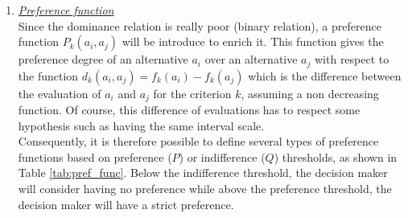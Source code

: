 \begin{enumerate}
\item \textit{\underline{Preference function}}\\
Since the dominance relation is really poor (binary relation), a preference function $P_k(a_i,a_j)$ will be introduce to enrich it. This function gives the preference degree of an alternative $a_i$ over an alternative $a_j$ with respect to the function $d_k(a_i,a_j) = f_k(a_i) - f_k(a_j)$ which is the difference between the evaluation of $a_i$ and $a_j$ for the criterion $k$, assuming a non decreasing function. Of course, this difference of evaluations has to respect some hypothesis such as having the same interval scale.\\
Consequently, it is therefore possible to define several types of preference functions based on preference ($P$) or indifference ($Q$) thresholds, as shown in Table \ref{tab:pref_func}. Below the indifference threshold, the decision maker will consider having no preference while above the preference threshold, the decision maker will have a strict preference.


\end{enumerate}
